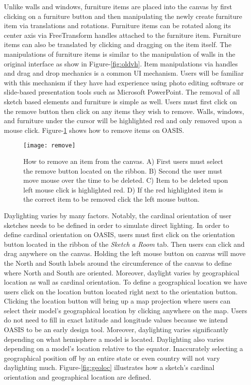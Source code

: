 		Unlike walls and windows, furniture items are placed into the canvas by first clicking on a furniture button  and then manipulating the newly create furniture item via translations and rotations. 
		Furniture items can be rotated along its center axis via FreeTransform handles attached to the furniture item.
		Furniture items can also be translated by clicking and dragging on the item itself.
		The manipulations of furniture items is similar to the manipulation of walls in the original interface as show in Figure-\ref{fig:oldvh}.
		Item manipulations via handles and drag and drop mechanics is a common UI mechanism. 
		Users will be familiar with this mechanism if they have had experience using photo editing software or slide-based presentation tools such as Microsoft PowerPoint\cite{}.
		The removal of all sketch based elements and furniture is simple as well.
		Users must first click on the remove button then click on any items they wish to remove. 
		Walls, windows, and furniture under the cursor will be highlighted red and only removed upon a mouse click.
		Figure-\ref{fig:remove} shows how to remove items on OASIS.

		\begin{figure}[t]
		\centering
		\texttt{[image: remove]}
		\caption{How to remove an item from the canvas. A) First users must select the remove button located on the ribbon. B) Second the user must move mouse over the time to be deleted. C) Item to be deleted upon left mouse click is highlighted red. D) If the red highlighted item is the correct item to be removed click the left mouse button. }
		\label{fig:remove}
		\end{figure}

		Daylighting varies by many factors.
		Notably, the cardinal orientation of user sketches needs to be defined in order to simulate direct lighting.
		In order to define cardinal orientation on OASIS, users must first click on the orientation button located in the ribbon of the \textit{Sketch a Room} tab.
		Then users can click and drag anywhere on the canvas.
		Holding the left mouse button on canvas will move the North and South labels around the circumference of the canvas to define where North and South are oriented.
		Moreover, daylight varies by geographical location as wall as cardinal orientation.
		To define a geographical location we have users click on the location button located right next to the orientation button.
		Clicking the location button will bring up a map projection where users can select their model's geographical location by clicking anywhere on the map.
		Users do not need to fill in exact latitude and longitude values because we intend OASIS to be an early design tool. 
		Moreover, daylighting varies significantly depending on what hemisphere a model is located. Daylighting also varies depending on a model's location relative to the equator.
		Inaccurately selecting a geographical position off by an entire state or even country will not vary daylighting much.
		Figure-\ref{fig:geoloc} illustrates how a sketch's cardinal orientation and geographical location are defined.

